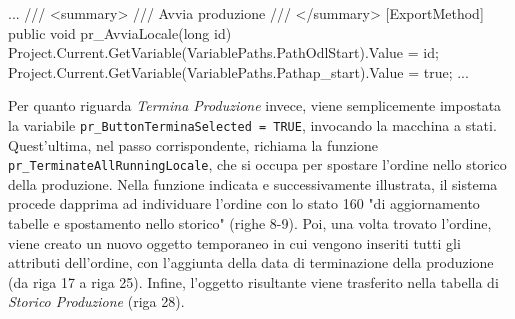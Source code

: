 \begin{csharp}
...
    /// <summary>
    /// Avvia produzione
    /// </summary>
    [ExportMethod]
    public void pr_AvviaLocale(long id)
    {
        Project.Current.GetVariable(VariablePaths.PathOdlStart).Value = id;
        Project.Current.GetVariable(VariablePaths.Pathap_start).Value = true;
    }
...
\end{csharp}

Per quanto riguarda \textit{Termina Produzione} invece, viene semplicemente impostata la variabile \verb|pr_ButtonTerminaSelected = TRUE|, invocando la macchina a stati. Quest'ultima, nel passo corrispondente, richiama la funzione \verb|pr_TerminateAllRunningLocale|, che si occupa per spostare l'ordine nello storico della produzione. Nella funzione indicata e successivamente illustrata, il sistema procede dapprima ad individuare l'ordine con lo stato 160 "di aggiornamento tabelle e spostamento nello storico" (righe 8-9). Poi, una volta trovato l'ordine, viene creato un nuovo oggetto temporaneo in cui vengono inseriti tutti gli attributi dell'ordine, con l'aggiunta della data di terminazione della produzione (da riga 17 a riga 25). Infine, l'oggetto risultante viene trasferito nella tabella di \textit{Storico Produzione} (riga 28).


